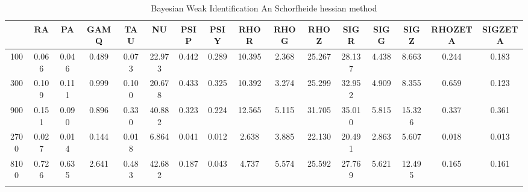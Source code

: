 \documentclass[a4paper,10pt]{article}
\begin{document}
\centering
\begin{longtable}{cccccccccccccccc}
\toprule
 & RA & PA & GAMQ & TAU & NU & PSIP & PSIY & RHOR & RHOG & RHOZ & SIGR & SIGG & SIGZ & RHOZETA & SIGZETA \\
\midrule
100 & 0.066 & 0.046 & 0.489 & 0.073 & 22.973 & 0.442 & 0.289 & 10.395 & 2.368 & 25.267 & 28.137 & 4.438 & 8.663 & 0.244 & 0.183 \\
300 & 0.109 & 0.111 & 0.999 & 0.100 & 20.678 & 0.433 & 0.325 & 10.392 & 3.274 & 25.299 & 32.952 & 4.909 & 8.355 & 0.659 & 0.123 \\
900 & 0.151 & 0.090 & 0.896 & 0.330 & 40.882 & 0.323 & 0.224 & 12.565 & 5.115 & 31.705 & 35.010 & 5.815 & 15.326 & 0.337 & 0.361 \\
2700 & 0.027 & 0.014 & 0.144 & 0.018 & 6.864 & 0.041 & 0.012 & 2.638 & 3.885 & 22.130 & 20.491 & 2.863 & 5.607 & 0.018 & 0.013 \\
8100 & 0.726 & 0.635 & 2.641 & 0.483 & 42.682 & 0.187 & 0.043 & 4.737 & 5.574 & 25.592 & 27.769 & 5.621 & 12.495 & 0.165 & 0.161 \\
\bottomrule
\caption{Bayesian Weak Identification An Schorfheide hessian method}
\label{table:tbl:WeakAnScho_hessian}
\end{longtable}
\end{document}
